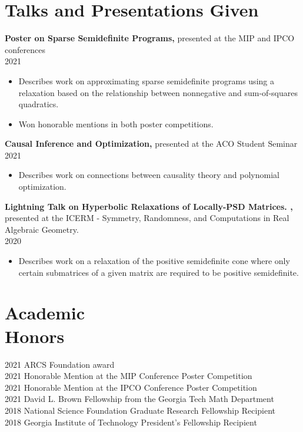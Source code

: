 \documentclass[margin]{res}
\begin{document}
\begin{resume}
\section{Talks and Presentations Given}


{\bf  Poster on Sparse Semidefinite Programs,} presented at the MIP and IPCO conferences \\ 2021 
\begin{itemize} \itemsep -2pt %
\item Describes work on approximating sparse semidefinite programs using a relaxation based on the relationship between nonnegative and sum-of-squares quadratics.
\item Won honorable mentions in both poster competitions.
\end{itemize}

{\bf  Causal Inference and Optimization,} presented at the ACO Student Seminar \\ 2021
\begin{itemize} \itemsep -2pt %
\item Describes work on connections between causality theory and polynomial optimization.
\end{itemize}

{\bf  Lightning Talk on Hyperbolic Relaxations of Locally-PSD Matrices.
,} 
presented at the ICERM - Symmetry, Randomness, and Computations in Real Algebraic Geometry.
 \\ 2020
\begin{itemize} \itemsep -2pt %
\item Describes work on a relaxation of the positive semidefinite cone where only certain submatrices of a given matrix are required to be positive semidefinite.
\end{itemize}


\section{Academic \\ Honors} 
2021 ARCS Foundation award\\
2021 Honorable Mention at the MIP Conference Poster Competition\\
2021 Honorable Mention at the IPCO Conference Poster Competition\\
2021 David L. Brown Fellowship from the Georgia Tech Math Department\\
2018 National Science Foundation Graduate Research Fellowship Recipient\\
2018 Georgia Institute of Technology President's Fellowship Recipient


\end{resume}
\end{document}
